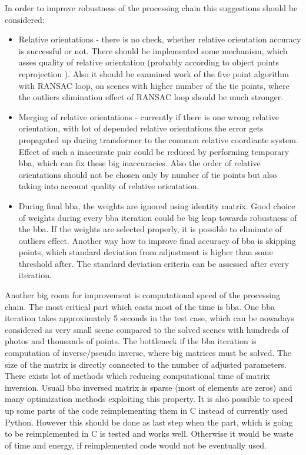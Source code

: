 \documentclass[a4paper,12pt]{report}
\begin{document}
In order to improve robustness of the processing chain this suggestions should be considered:
\begin{itemize}
\item Relative orientations - there is no check, whether relative orientation accuracy is successful or not. There 
should be implemented some mechanism, which asses quality of relative orientation (probably according to object points reprojection ).
Also it should be examined work of the five point algorithm with RANSAC loop, on scenes with higher number of the tie points, where 
the outliers elimination effect of RANSAC loop should be much stronger.
\item  Merging of relative orientations - currently if there is one wrong relative orientation, with lot of depended relative orientations  
the error gets propagated up during transformer to the common relative coordiante system. Effect of such a inaccurate pair could be 
reduced by performing  temporary bba, which can fix these big inaccuracies. Also the order of relative orientations should not 
be chosen only by number of tie points but also taking into account quality of relative orientation.
\item During final bba, the weights are ignored using identity matrix. Good choice of weights during every bba iteration 
could be big leap towards robustness of the bba. If the weights are selected properly, it is possible to eliminate of outliers 
effect.
Another way how to improve final accuracy of bba is skipping points, which 
standard deviation from adjustment is higher than some threshold after. The standard deviation criteria can be assessed 
after every iteration.
\end{itemize}


Another big room for improvement is computational speed of the processing chain.
The most critical part which costs most of the time is bba.
One bba iteration takes approximately 5 seconds in the test case, which can be nowadays considered as very small scene compared to the solved
scenes with hundreds of photos and thousands of points. The bottleneck if the bba iteration is computation of inverse/pseudo inverse, where big matrices 
must be solved. The size of the matrix is directly connected to the number of adjusted parameters. There exists  lot of methods which reducing computational 
time of matrix inversion. Usuall bba inversed matrix is sparse (most of elements are zeros) and many optimization methods exploiting this property.
It is also possible to speed up some parts of the code reimplementing them in C instead of currently used Python. However this should be done 
as last step when the part, which is going to be reimplemented in C is tested and works well. Otherwise it would be waste of time and energy, if reimplemented 
code would not be eventually used. 
\end{document}
